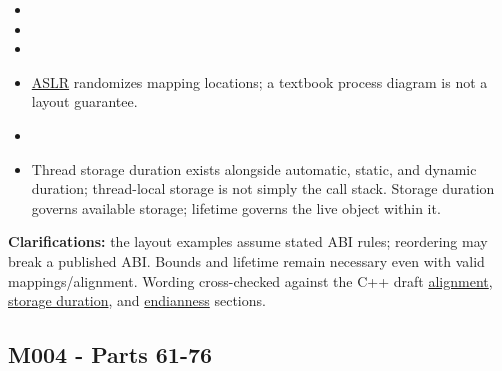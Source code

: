 \begin{itemize}
\tightlist
\item
\item
\item
\item
  \hyperref[appendix-78cb248c8355]{ASLR} randomizes mapping locations; a textbook process diagram is not a layout guarantee.
\item
\item
  Thread storage duration exists alongside automatic, static, and dynamic duration; thread-local storage is not simply the call stack. Storage duration governs available storage; lifetime governs the live object within it.
\end{itemize}

\textbf{Clarifications:} the layout examples assume stated ABI rules; reordering may break a published ABI. Bounds and lifetime remain necessary even with valid mappings/alignment. Wording cross-checked against the C++ draft \href{https://eel.is/c++draft/basic.align}{alignment}, \href{https://eel.is/c++draft/basic.stc}{storage duration}, and \href{https://eel.is/c++draft/bit.endian}{endianness} sections.

\subsection{M004 - Parts 61-76}\label{appendix-fd090d982a15-m004---parts-61-76}

